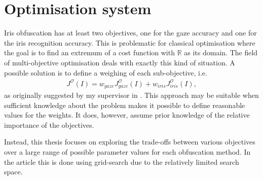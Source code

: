 \section{Optimisation system}
Iris obfuscation has at least two objectives, one for the gaze accuracy and one for the iris recognition accuracy. This is problematic for classical optimisation where the goal is to find an extremum of a cost function with $\mathbb{R}$ as its domain. The field of multi-objective optimisation deals with exactly this kind of situation. A possible solution is to define a weighing of each sub-objective, i.e.
\begin{align}\label{eq:weights}
	J^{\mathcal{O}}(I) = w_{gaze}J_{gaze}^{\mathcal{O}}(I) +  w_{iris}J_{iris}^{\mathcal{O}}(I),
\end{align}
as originally suggested by my supervisor in \cite{proposal}. This approach may be suitable when sufficient knowledge about the problem makes it possible to define reasonable values for the weights. It does, however, assume prior knowledge of the relative importance of the objectives. 

Instead, this thesis focuses on exploring the trade-offs between various objectives over a large range of possible parameter values for each obfuscation method. In the article this is done using grid-search due to the relatively limited search space. %

